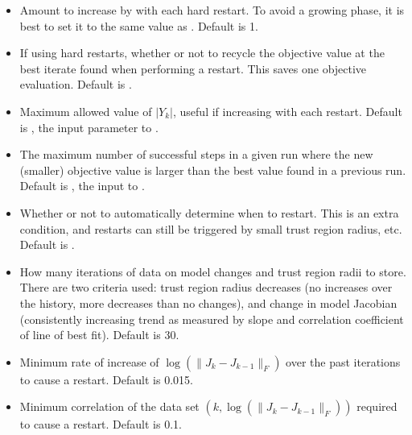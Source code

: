 \documentclass[letterpaper,10pt,english]{sphinxmanual}
\begin{document}
\begin{itemize}
\item {} 
\sphinxAtStartPar
{} \sphinxhyphen{} Amount to increase  by with each hard restart. To avoid a growing phase, it is best to set it to the same value as . Default is 1.

\item {} 
\sphinxAtStartPar
{} \sphinxhyphen{} If using hard restarts, whether or not to recycle the objective value at the best iterate found when performing a restart. This saves one objective evaluation. Default is .

\item {} 
\sphinxAtStartPar
{} \sphinxhyphen{} Maximum allowed value of \(|Y_k|\), useful if increasing with each restart. Default is , the input parameter to .

\item {} 
\sphinxAtStartPar
{} \sphinxhyphen{} The maximum number of successful steps in a given run where the new (smaller) objective value is larger than the best value found in a previous run. Default is , the input to .

\item {} 
\sphinxAtStartPar
{} \sphinxhyphen{} Whether or not to automatically determine when to restart. This is an extra condition, and restarts can still be triggered by small trust region radius, etc. Default is .

\item {} 
\sphinxAtStartPar
{} \sphinxhyphen{} How many iterations of data on model changes and trust region radii to store. There are two criteria used: trust region radius decreases (no increases over the history, more decreases than no changes), and change in model Jacobian (consistently increasing trend as measured by slope and correlation coefficient of line of best fit). Default is 30.

\item {} 
\sphinxAtStartPar
{} \sphinxhyphen{} Minimum rate of increase of \(\log(\|J_k-J_{k-1}\|_F)\) over the past iterations to cause a restart. Default is 0.015.

\item {} 
\sphinxAtStartPar
{} \sphinxhyphen{} Minimum correlation of the data set \((k, \log(\|J_k-J_{k-1}\|_F))\) required to cause a restart. Default is 0.1.

\end{itemize}
\end{document}
